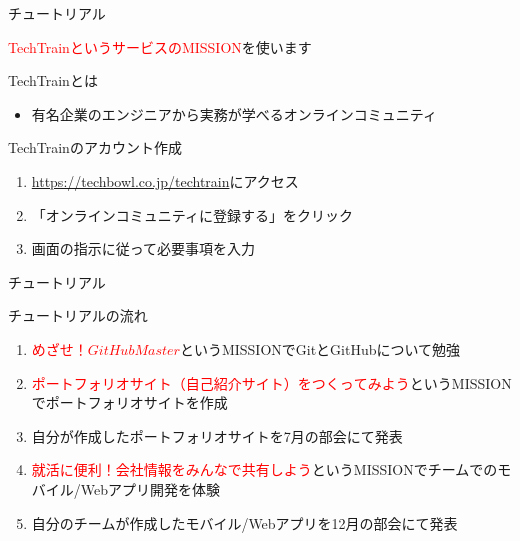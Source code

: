 \documentclass[12pt, unicode]{beamer}
\begin{document}
\begin{frame}{チュートリアル}
    \begin{center}
        {\large \textcolor{red}{TechTrainというサービスのMISSION}を使います}
    \end{center}

    \begin{block}{TechTrainとは}
        \begin{itemize}
            \item 有名企業のエンジニアから実務が学べるオンラインコミュニティ
        \end{itemize}
    \end{block}

    \begin{block}{TechTrainのアカウント作成}
        \begin{enumerate}
            \item \textcolor{blue}{\url{https://techbowl.co.jp/techtrain}}にアクセス
            \item 「オンラインコミュニティに登録する」をクリック
            \item 画面の指示に従って必要事項を入力
        \end{enumerate}
    \end{block}
\end{frame}

\begin{frame}{チュートリアル}
    \begin{block}{チュートリアルの流れ}
        \begin{enumerate}
            \item \textcolor{red}{$めざせ！GitHubMaster$}というMISSIONでGitとGitHubについて勉強
            \item \textcolor{red}{$ポートフォリオサイト（自己紹介サイト）をつくってみよう$}というMISSIONでポートフォリオサイトを作成
            \item 自分が作成したポートフォリオサイトを7月の部会にて発表
            \item \textcolor{red}{$就活に便利！会社情報をみんなで共有しよう$}というMISSIONでチームでのモバイル/Webアプリ開発を体験
            \item 自分のチームが作成したモバイル/Webアプリを12月の部会にて発表
        \end{enumerate}
    \end{block}
\end{frame}
\end{document}
